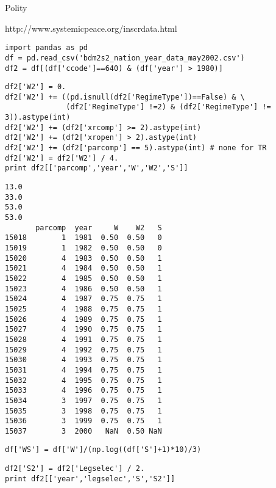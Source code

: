 \documentclass[12pt,fleqn]{article}\usepackage{common}
\begin{document}
Polity

http://www.systemicpeace.org/inscrdata.html

\begin{verbatim}
import pandas as pd
df = pd.read_csv('bdm2s2_nation_year_data_may2002.csv')
df2 = df[(df['ccode']==640) & (df['year'] > 1980)]
\end{verbatim}

\begin{verbatim}
df2['W2'] = 0.
df2['W2'] += ((pd.isnull(df2['RegimeType'])==False) & \
              (df2['RegimeType'] !=2) & (df2['RegimeType'] != 3)).astype(int)
df2['W2'] += (df2['xrcomp'] >= 2).astype(int)
df2['W2'] += (df2['xropen'] > 2).astype(int)
df2['W2'] += (df2['parcomp'] == 5).astype(int) # none for TR
df2['W2'] = df2['W2'] / 4.
print df2[['parcomp','year','W','W2','S']]
\end{verbatim}

\begin{verbatim}
13.0
33.0
53.0
53.0
       parcomp  year     W    W2   S
15018        1  1981  0.50  0.50   0
15019        1  1982  0.50  0.50   0
15020        4  1983  0.50  0.50   1
15021        4  1984  0.50  0.50   1
15022        4  1985  0.50  0.50   1
15023        4  1986  0.50  0.50   1
15024        4  1987  0.75  0.75   1
15025        4  1988  0.75  0.75   1
15026        4  1989  0.75  0.75   1
15027        4  1990  0.75  0.75   1
15028        4  1991  0.75  0.75   1
15029        4  1992  0.75  0.75   1
15030        4  1993  0.75  0.75   1
15031        4  1994  0.75  0.75   1
15032        4  1995  0.75  0.75   1
15033        4  1996  0.75  0.75   1
15034        3  1997  0.75  0.75   1
15035        3  1998  0.75  0.75   1
15036        3  1999  0.75  0.75   1
15037        3  2000   NaN  0.50 NaN
\end{verbatim}


\begin{verbatim}
df['WS'] = df['W']/(np.log((df['S']+1)*10)/3)
\end{verbatim}


\begin{verbatim}
df2['S2'] = df2['Legselec'] / 2.
print df2[['year','legselec','S','S2']]
\end{verbatim}
\end{document}
